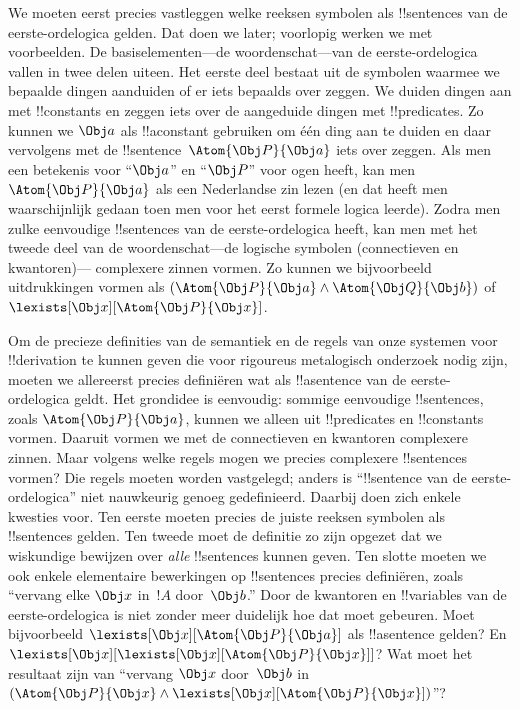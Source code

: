 \documentclass[openany]{memoir}
\begin{document}
We moeten eerst precies vastleggen welke reeksen symbolen als
!!{sentence}s van de eerste-ordelogica gelden. Dat doen we later;
voorlopig werken we met voorbeelden. De basiselementen---de
woordenschat---van de eerste-ordelogica vallen in twee delen uiteen.
Het eerste deel bestaat uit de symbolen waarmee we bepaalde dingen
aanduiden of er iets bepaalds over zeggen. We duiden dingen aan met
!!{constant}s en zeggen iets over de aangeduide dingen met
!!{predicate}s. Zo kunnen we $\Obj a$ als !!a{constant} gebruiken om
één ding aan te duiden en daar vervolgens met de
!!{sentence}~$\Atom{\Obj P}{\Obj a}$ iets over zeggen. Als men een
betekenis voor ``$\Obj a$'' en ``$\Obj P$'' voor ogen heeft, kan men
$\Atom{\Obj P}{\Obj a}$ als een Nederlandse zin lezen (en dat heeft
men waarschijnlijk gedaan toen men voor het eerst formele logica
leerde). Zodra men zulke eenvoudige !!{sentence}s van de
eerste-ordelogica heeft, kan men met het tweede deel van de
woordenschat---de logische symbolen (connectieven en kwantoren)---
complexere zinnen vormen. Zo kunnen we bijvoorbeeld uitdrukkingen
vormen als $(\Atom{\Obj P}{\Obj a} \land \Atom{\Obj Q}{\Obj b})$
of~$\lexists[\Obj x][\Atom{\Obj P}{\Obj x}]$.

Om de precieze definities van de semantiek en de regels van onze
systemen voor !!{derivation} te kunnen geven die voor rigoureus
metalogisch onderzoek nodig zijn, moeten we allereerst precies
definiëren wat als !!a{sentence} van de eerste-ordelogica geldt. Het
grondidee is eenvoudig: sommige eenvoudige !!{sentence}s, zoals
$\Atom{\Obj P}{\Obj a}$, kunnen we alleen uit !!{predicate}s en
!!{constant}s vormen. Daaruit vormen we met de connectieven en
kwantoren complexere zinnen. Maar volgens welke regels mogen we
precies complexere !!{sentence}s vormen? Die regels moeten worden
vastgelegd; anders is ``!!{sentence} van de eerste-ordelogica'' niet
nauwkeurig genoeg gedefinieerd. Daarbij doen zich enkele kwesties
voor. Ten eerste moeten precies de juiste reeksen symbolen als
!!{sentence}s gelden. Ten tweede moet de definitie zo zijn opgezet dat
we wiskundige bewijzen over \emph{alle} !!{sentence}s kunnen geven.
Ten slotte moeten we ook enkele elementaire bewerkingen op
!!{sentence}s precies definiëren, zoals ``vervang elke $\Obj x$ in~$!A$
door~$\Obj b$.'' Door de kwantoren en !!{variable}s van de
eerste-ordelogica is niet zonder meer duidelijk hoe dat moet gebeuren.
Moet bijvoorbeeld $\lexists[\Obj x][\Atom{\Obj P}{\Obj a}]$ als
!!a{sentence} gelden? En
$\lexists[\Obj x][\lexists[\Obj x][\Atom{\Obj P}{\Obj x}]]$? Wat moet
het resultaat zijn van ``vervang $\Obj x$ door~$\Obj b$ in
$(\Atom{\Obj P}{\Obj x} \land \lexists[\Obj x][\Atom{\Obj P}{\Obj
x}])$''?
\endgroup
\end{document}
